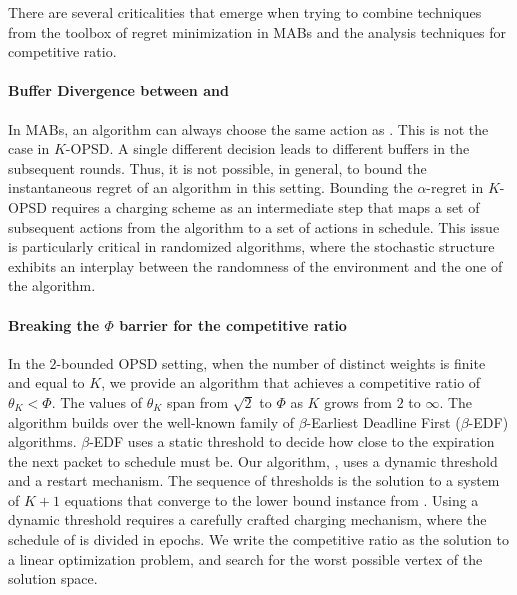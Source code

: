 There are several criticalities that emerge when trying to combine techniques from the toolbox of regret minimization in MABs and the analysis techniques for competitive ratio.
\paragraph{Buffer Divergence between \alg and \opt} In MABs, an algorithm can always choose the same action as \opt. This is not the case in $K$-OPSD. A single different decision leads to different buffers in the subsequent rounds. Thus, it is not possible, in general, to bound the instantaneous regret of an algorithm in this setting. Bounding the $\alpha$-regret in $K$-OPSD requires a charging scheme as an intermediate step that maps a set of subsequent actions from the algorithm to a set of actions in \opt schedule. This issue is particularly critical in randomized algorithms, where the stochastic structure exhibits an interplay between the randomness of the environment and the one of the algorithm. 
\paragraph{Breaking the $\Phi$ barrier for the competitive ratio} In the $2$-bounded OPSD setting, when the number of distinct weights is finite and equal to $K$, we provide an algorithm that achieves a competitive ratio of $\theta_K < \Phi$. The values of $\theta_K$ span from $\sqrt{2}$ to $\Phi$ as $K$ grows from $2$ to $\infty$. The algorithm builds over the well-known family of $\beta$-Earliest Deadline First ($\beta$-EDF) algorithms. $\beta$-EDF uses a static threshold to decide how close to the expiration the next packet to schedule must be. Our algorithm, \algtheta, uses a dynamic threshold and a restart mechanism. The sequence of thresholds is the solution to a system of $K+1$ equations that converge to the lower bound instance from \cite{hajek2001competitiveness}. Using a dynamic threshold requires a carefully crafted charging mechanism, where the schedule of \algtheta is divided in epochs. We write the competitive ratio as the solution to a linear optimization problem, and search for the worst possible vertex of the solution space.
